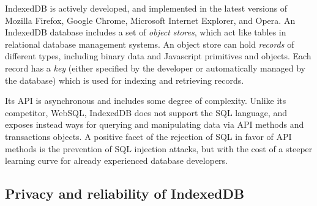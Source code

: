 IndexedDB is actively developed, and implemented in the latest versions of Mozilla Firefox, Google Chrome, Microsoft Internet Explorer, and Opera. An IndexedDB database includes a set of \emph{object stores}, which act like tables in relational database management systems. An object store can hold \emph{records} of different types, including binary data and Javascript primitives and objects. Each record has a \emph{key} (either specified by the developer or automatically managed by the database) which is used for indexing and retrieving records.

Its API is asynchronous and includes some degree of complexity. Unlike its competitor, WebSQL, IndexedDB does not support the SQL language, and exposes instead ways for querying and manipulating data via API methods and transactions objects. A positive facet of the rejection of SQL in favor of API methods is the prevention of SQL injection attacks, but with the cost of a steeper learning curve for already experienced database developers.

\subsection{Privacy and reliability of IndexedDB}


